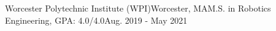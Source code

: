 
\begin{rSubsection}
{Worcester Polytechnic Institute (WPI)}{Worcester, MA}{M.S. in Robotics Engineering, GPA: 4.0/4.0}{Aug. 2019 - May 2021}
\end{rSubsection}
\vspace{0.1cm}







